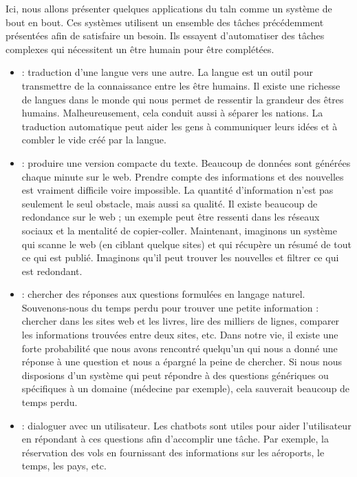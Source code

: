\documentclass{KodeBook}
\begin{document}
Ici, nous allons présenter quelques applications du \ac{taln} comme un système de bout en bout. 
Ces systèmes utilisent un ensemble des tâches précédemment présentées afin de satisfaire un besoin. 
Ils essayent d'automatiser des tâches complexes qui nécessitent un être humain pour être complétées.
\begin{itemize}
	\item {} : traduction d'une langue vers une autre.
	La langue est un outil pour transmettre de la connaissance entre les être humains. 
	Il existe une richesse de langues dans le monde qui nous permet de ressentir la grandeur des êtres humains.
	Malheureusement, cela conduit aussi à séparer les nations.
	La traduction automatique peut aider les gens à communiquer leurs idées et à combler le vide créé par la langue. 
	\item {} : produire une version compacte du texte.
	Beaucoup de données sont générées chaque minute sur le web. 
	Prendre compte des informations et des nouvelles est vraiment difficile voire impossible.
	La quantité d'information n'est pas seulement le seul obstacle, mais aussi sa qualité. 
	Il existe beaucoup de redondance sur le web ; un exemple peut être ressenti dans les réseaux sociaux et la mentalité de copier-coller. 
	Maintenant, imaginons un système qui scanne le web (en ciblant quelque sites) et qui récupère un résumé de tout ce qui est publié. 
	Imaginons qu'il peut trouver les nouvelles et filtrer ce qui est redondant.
	
	\item {} : chercher des réponses aux questions formulées en langage naturel.
	Souvenons-nous du temps perdu pour trouver une petite information : chercher dans les sites web et les livres, lire des milliers de lignes, comparer les informations trouvées entre deux sites, etc.
	Dans notre vie, il existe une forte probabilité que nous avons rencontré quelqu'un qui nous a donné une réponse à une question et nous a épargné la peine de chercher.
	Si nous nous disposions d'un système qui peut répondre à des questions génériques ou spécifiques à un domaine (médecine par exemple), cela sauverait beaucoup de temps perdu.
	
	\item {} : dialoguer avec un utilisateur. 
	Les chatbots sont utiles pour aider l'utilisateur en répondant à ces questions afin d'accomplir une tâche.
	Par exemple, la réservation des vols en fournissant des informations sur les aéroports, le temps, les pays, etc. 
	

\end{itemize}
\end{document}
